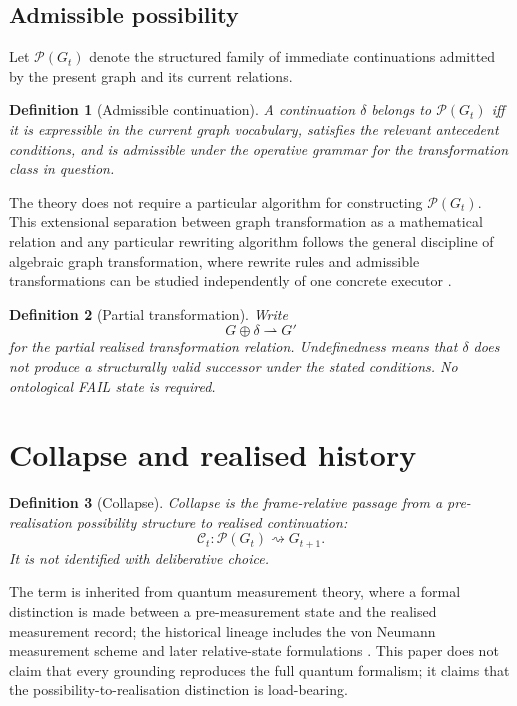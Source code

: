 \documentclass[11pt,a4paper]{article}
\newtheorem{definition}{Definition}[section]
\theoremstyle{remark}\newtheorem{remark}[definition]{Remark}
\newcommand{\Poss}{\mathcal{P}}
\newcommand{\Coll}{\mathcal{C}}
\begin{document}
\subsection{Admissible possibility}\label{sec:admissible}
Let $\Poss(G_t)$ denote the structured family of immediate continuations admitted by the present graph and its current relations.
\begin{definition}[Admissible continuation]\label{def:admissible}
A continuation $\delta$ belongs to $\Poss(G_t)$ iff it is expressible in the current graph vocabulary, satisfies the relevant antecedent conditions, and is admissible under the operative grammar for the transformation class in question.
\end{definition}
The theory does not require a particular algorithm for constructing $\Poss(G_t)$. This extensional separation between graph transformation as a mathematical relation and any particular rewriting algorithm follows the general discipline of algebraic graph transformation, where rewrite rules and admissible transformations can be studied independently of one concrete executor \citep{ehrig2006}.

\begin{definition}[Partial transformation]\label{def:partial-transformation}
Write
\[G\oplus\delta\rightharpoonup G'\]
for the partial realised transformation relation. Undefinedness means that $\delta$ does not produce a structurally valid successor under the stated conditions. No ontological \textnormal{\textsc{FAIL}} state is required.
\end{definition}

\section{Collapse and realised history}\label{sec:collapse-law}
\begin{definition}[Collapse]\label{def:collapse}
Collapse is the frame-relative passage from a pre-realisation possibility structure to realised continuation:
\[\boxed{\Coll_t:\Poss(G_t)\rightsquigarrow G_{t+1}.}\]
It is not identified with deliberative choice.
\end{definition}
The term is inherited from quantum measurement theory, where a formal distinction is made between a pre-measurement state and the realised measurement record; the historical lineage includes the von Neumann measurement scheme and later relative-state formulations \citep{vonneumann1955,everett1957}. This paper does not claim that every grounding reproduces the full quantum formalism; it claims that the possibility-to-realisation distinction is load-bearing.
\end{document}
